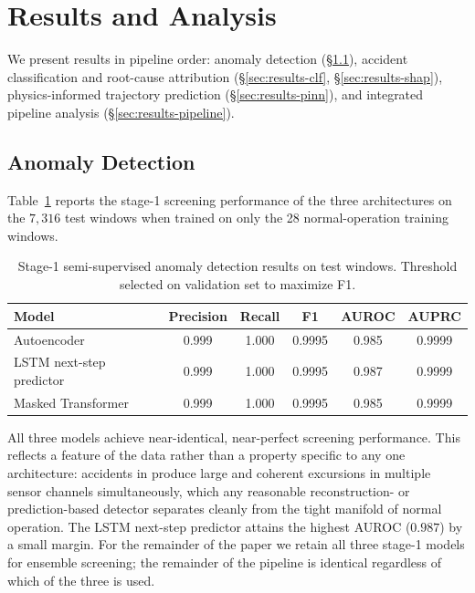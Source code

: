 \section{Results and Analysis}
\label{sec:results}

We present results in pipeline order: anomaly detection (\S\ref{sec:results-anomaly}), accident classification and root-cause attribution (\S\ref{sec:results-clf}, \S\ref{sec:results-shap}), physics-informed trajectory prediction (\S\ref{sec:results-pinn}), and integrated pipeline analysis (\S\ref{sec:results-pipeline}).

\subsection{Anomaly Detection}
\label{sec:results-anomaly}

Table~\ref{tab:anomaly} reports the stage-1 screening performance of the three architectures on the $7{,}316$ test windows when trained on only the 28 normal-operation training windows.

\begin{table}[H]
    \centering
    \small
    \caption{Stage-1 semi-supervised anomaly detection results on \nppad{} test windows. Threshold selected on validation set to maximize F1.}
    \label{tab:anomaly}
    \begin{tabular}{@{}lccccc@{}}
        \toprule
        Model & Precision & Recall & F1 & AUROC & AUPRC \\
        \midrule
        Autoencoder & 0.999 & 1.000 & 0.9995 & 0.985 & 0.9999 \\
        LSTM next-step predictor & 0.999 & 1.000 & 0.9995 & 0.987 & 0.9999 \\
        Masked Transformer & 0.999 & 1.000 & 0.9995 & 0.985 & 0.9999 \\
        \bottomrule
    \end{tabular}
\end{table}

All three models achieve near-identical, near-perfect screening performance. This reflects a feature of the \nppad{} data rather than a property specific to any one architecture: accidents in \nppad{} produce large and coherent excursions in multiple sensor channels simultaneously, which any reasonable reconstruction- or prediction-based detector separates cleanly from the tight manifold of normal operation. The LSTM next-step predictor attains the highest AUROC ($0.987$) by a small margin. For the remainder of the paper we retain all three stage-1 models for ensemble screening; the remainder of the pipeline is identical regardless of which of the three is used.

